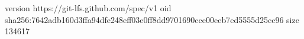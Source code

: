 version https://git-lfs.github.com/spec/v1
oid sha256:7642adb160d3ffa94dfe248eff03e0ff8dd9701690cce00eeb7ed5555d25cc96
size 134617
